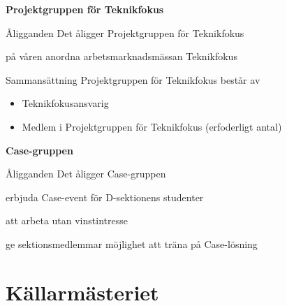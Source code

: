 \documentclass[pdfbookmarks,a4paper,11pt]{article}
\newlength{\itemcollength}
\newenvironment{reglemlista}{%
  \begin{list}{}{%
      \setlength{\labelwidth}{\itemcollength}%
      \setlength{\leftmargin}{\labelwidth + \labelsep}%
      \renewcommand{\makelabel}[1]{%
        \raisebox{0pt}[1ex][0pt]{%
          \makebox[\labelwidth][l]{%
            \parbox[t]{\itemcollength}{%
              \raggedright\hspace{0pt}##1}}}\hfill}%
      }}{%
  \end{list}}
\begin{document}
\textbf{Projektgruppen för Teknikfokus}
\begin{reglemlista}
	\item[Åligganden]
	Det åligger Projektgruppen för Teknikfokus
	
	\begin{attlista}
		\item på våren anordna arbetsmarknadsmässan Teknikfokus
	\end{attlista}

	\item[Sammansättning]
	Projektgruppen för Teknikfokus består av
	\begin{itemize}
		\item Teknikfokusansvarig
		\item Medlem i Projektgruppen för Teknikfokus (erfoderligt antal)
	\end{itemize}
\end{reglemlista}

\textbf{Case-gruppen}
\begin{reglemlista}
	\item[Åligganden]
    Det åligger Case-gruppen
    \begin{attlista}
    	\item erbjuda Case-event för D-sektionens studenter
        \item att arbeta utan vinstintresse
        \item ge sektionsmedlemmar möjlighet att träna på Case-lösning
    \end{attlista}
\end{reglemlista}

\section{Källarmästeriet}
\end{document}
